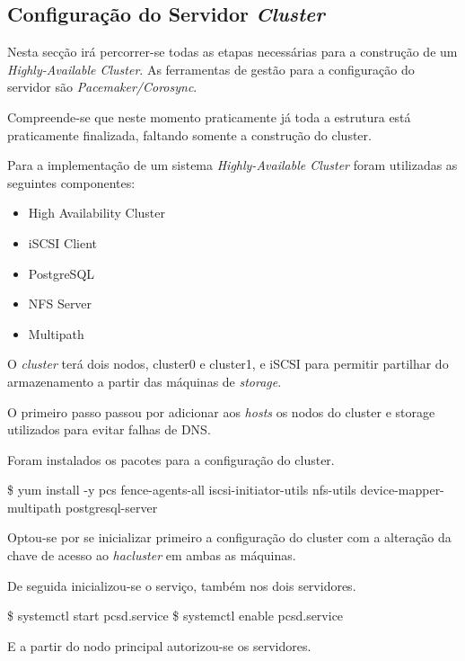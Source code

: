 \subsection{Configuração do Servidor \textit{Cluster}}

Nesta secção irá percorrer-se todas as etapas necessárias para a construção de um \textit{Highly-Available Cluster}. As ferramentas de gestão para a configuração do servidor são \textit{Pacemaker/Corosync}.

Compreende-se que neste momento praticamente já toda a estrutura está praticamente finalizada, faltando somente a construção do cluster.

Para a implementação de um sistema \textit{Highly-Available Cluster} foram utilizadas as seguintes componentes:

\begin{itemize}
  \item High Availability Cluster
  \item iSCSI Client
  \item PostgreSQL
  \item NFS Server
  \item Multipath
\end{itemize}

O \textit{cluster} terá dois nodos, cluster0 e cluster1, e iSCSI para permitir partilhar do armazenamento a partir das máquinas de \textit{storage}.

O primeiro passo passou por adicionar aos \textit{hosts} os nodos do cluster e storage utilizados para evitar falhas de DNS.

Foram instalados os pacotes para a configuração do cluster.

\begin{MyVerbatims}
  \$ yum install -y pcs fence-agents-all iscsi-initiator-utils nfs-utils device-mapper-multipath postgresql-server
\end{MyVerbatims}

Optou-se por se inicializar primeiro a configuração do cluster com a alteração da chave de acesso ao \textit{hacluster} em ambas as máquinas.

De seguida inicializou-se o serviço, também nos dois servidores.

\begin{MyVerbatims}
  \$ systemctl start pcsd.service
  \$ systemctl enable pcsd.service
\end{MyVerbatims}

E a partir do nodo principal autorizou-se os servidores.

